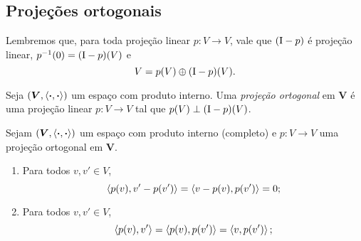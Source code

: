 \subsection{Projeções ortogonais}

Lembremos que, para toda projeção linear $p\colon V \to V$, vale que $(\mathrm{I}-p)$ é projeção linear, $p^{-1}(0) = (\mathrm{I}-p)(V)$ e
	\begin{equation*}
	V = p(V) \oplus (\mathrm{I}-p)(V).
	\end{equation*}

\begin{definition}
Seja $(\bm V, \left\langle{\bm{\cdot}},{\bm{\cdot}}\right\rangle)$ um espaço com produto interno. Uma \emph{projeção ortogonal} em $\bm V$ é uma projeção linear $p\colon V \to V$ tal que $p(V) \perp (\mathrm{I}-p)(V)$.
\end{definition}

\begin{proposition}
Sejam $(\bm V, \left\langle{\bm{\cdot}},{\bm{\cdot}}\right\rangle)$ um espaço com produto interno (completo) e $p\colon V \to V$ uma projeção ortogonal em $\bm V$.
	\begin{enumerate}
	\item Para todos $v,v' \in V$,
		\begin{equation*}
		\left\langle{p(v)},{v' - p(v')}\right\rangle = \left\langle{v-p(v)},{p(v')}\right\rangle = 0;
		\end{equation*}
	
	\item Para todos $v,v' \in V$,
		\begin{equation*}
		\left\langle{p(v)},{v'}\right\rangle = \left\langle{p(v)},{p(v')}\right\rangle = \left\langle{v},{p(v')}\right\rangle;
		\end{equation*}
	\end{enumerate}
\end{proposition}

